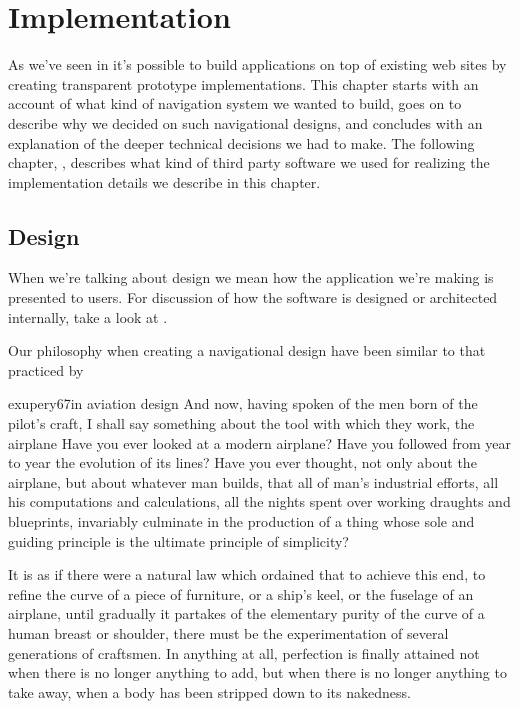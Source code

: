 \chapter{Implementation}
\label{chapter:implementation}

As we've seen in 
it's possible to build applications on top of existing web sites by creating
transparent prototype implementations. This chapter starts with an account of
what kind of navigation system we wanted to build, goes on to describe why we
decided on such navigational designs, and concludes with an explanation of the
deeper technical decisions we had to make. The following chapter,
,
describes what kind of third party software we used for realizing the
implementation details we describe in this chapter.

\section{Design}

When we're talking about design we mean how the application we're making is
presented to users. For discussion of how the software is designed
or architected internally, take a look at
.

Our philosophy when creating a navigational design have been
similar to that practiced by
\begin{fullquotation}[\chap{3}]{exupery67}{in aviation design}
  \noindent
  And now, having spoken of the men born of the pilot's craft, I shall say
  something about the tool with which they work, the airplane Have you
  ever looked at a modern airplane? Have you followed from year to year
  the evolution of its lines? Have you ever thought, not only about the
  airplane, but about whatever man builds, that all of man's industrial
  efforts, all his computations and calculations, all the nights spent
  over working draughts and blueprints, invariably culminate in the
  production of a thing whose sole and guiding principle is the ultimate
  principle of simplicity?

  It is as if there were a natural law which ordained that to achieve this
  end, to refine the curve of a piece of furniture, or a ship's keel, or
  the fuselage of an airplane, until gradually it partakes of the
  elementary purity of the curve of a human breast or shoulder, there must
  be the experimentation of several generations of craftsmen. In anything
  at all, perfection is finally attained not when there is no longer
  anything to add, but when there is no longer anything to take away,
  when a body has been stripped down to its nakedness.
\end{fullquotation}

